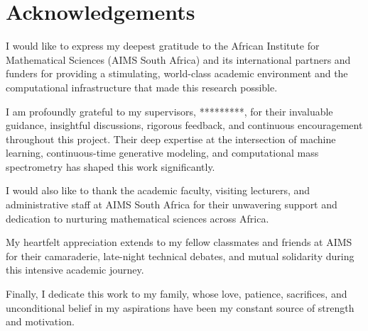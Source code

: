 \chapter*{Acknowledgements}

I would like to express my deepest gratitude to the African Institute for Mathematical Sciences (AIMS South Africa) and its international partners and funders for providing a stimulating, world-class academic environment and the computational infrastructure that made this research possible.

I am profoundly grateful to my supervisors, *********, for their invaluable guidance, insightful discussions, rigorous feedback, and continuous encouragement throughout this project. Their deep expertise at the intersection of machine learning, continuous-time generative modeling, and computational mass spectrometry has shaped this work significantly.

I would also like to thank the academic faculty, visiting lecturers, and administrative staff at AIMS South Africa for their unwavering support and dedication to nurturing mathematical sciences across Africa. 

My heartfelt appreciation extends to my fellow classmates and friends at AIMS for their camaraderie, late-night technical debates, and mutual solidarity during this intensive academic journey. 

Finally, I dedicate this work to my family, whose love, patience, sacrifices, and unconditional belief in my aspirations have been my constant source of strength and motivation.
